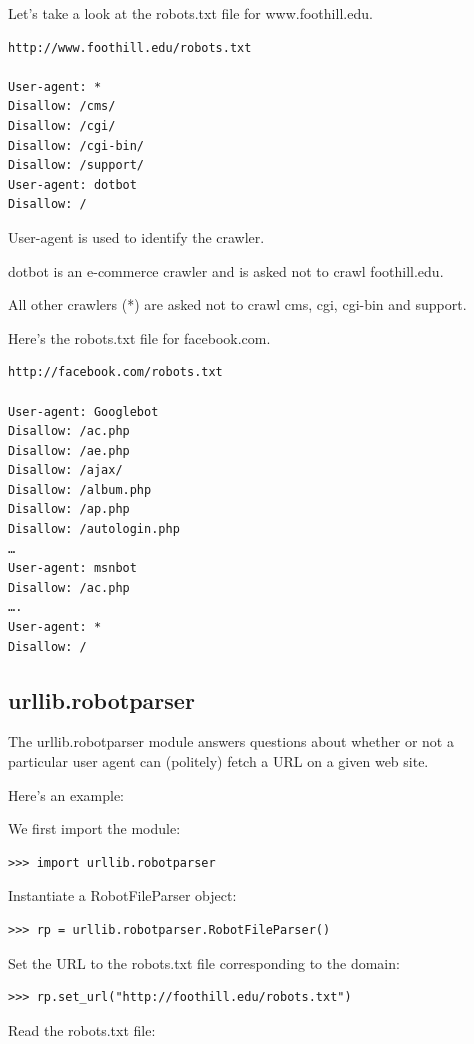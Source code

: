 \documentclass{article}
\begin{document}
Let's take a look at the robots.txt file for www.foothill.edu.

\begin{lstlisting}
http://www.foothill.edu/robots.txt

User-agent: * 
Disallow: /cms/ 
Disallow: /cgi/ 
Disallow: /cgi-bin/ 
Disallow: /support/ 
User-agent: dotbot 
Disallow: /
\end{lstlisting}

User-agent is used to identify the crawler. 

dotbot is an e-commerce crawler and is asked not to crawl foothill.edu.

All other crawlers (*) are asked not to crawl cms, cgi, cgi-bin and support.

Here's the robots.txt file for facebook.com.

\begin{lstlisting}
http://facebook.com/robots.txt

User-agent: Googlebot 
Disallow: /ac.php 
Disallow: /ae.php 
Disallow: /ajax/ 
Disallow: /album.php 
Disallow: /ap.php 
Disallow: /autologin.php 
…
User-agent: msnbot 
Disallow: /ac.php 
….
User-agent: * 
Disallow: /
\end{lstlisting}

\subsection{urllib.robotparser}
The urllib.robotparser module answers questions about whether or not a particular user agent can (politely) fetch a URL on a given web site.

Here's an example:

We first import the module:

\begin{lstlisting}
>>> import urllib.robotparser
\end{lstlisting}

Instantiate a RobotFileParser object:

\begin{lstlisting}
>>> rp = urllib.robotparser.RobotFileParser() 
\end{lstlisting}

Set the URL to the robots.txt file corresponding to the domain:

\begin{lstlisting}
>>> rp.set_url("http://foothill.edu/robots.txt") 
\end{lstlisting}

Read the robots.txt file:
\end{document}

